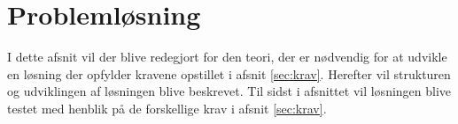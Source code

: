 \section{Problemløsning}
\label{sec:problemlosning}
I dette afsnit vil der blive redegjort for den teori, der er nødvendig for at udvikle en løsning der opfylder kravene opstillet i afsnit \ref{sec:krav}. Herefter vil strukturen og udviklingen af løsningen blive beskrevet. Til sidst i afsnittet vil løsningen blive testet med henblik på de forskellige krav i afsnit \ref{sec:krav}.


\clearpage

\clearpage

\clearpage